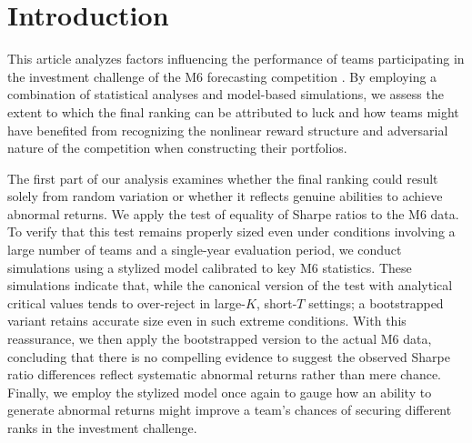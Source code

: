\documentclass[3p,times,twocolumn]{elsarticle}
\begin{document}
\section{Introduction}

This article analyzes factors influencing the performance of teams participating in the investment challenge of the M6 forecasting competition \citep[see][]{makridakisM6ForecastingCompetition2023}.
By employing a combination of statistical analyses and model-based simulations, we assess the extent to which the final ranking can be attributed to luck and how teams might have benefited from recognizing the nonlinear reward structure and adversarial nature of the competition when constructing their portfolios.

The first part of our analysis examines whether the final ranking could result solely from random variation or whether it reflects genuine abilities to achieve abnormal returns.
We apply the \cite{wrightTestEqualityMultiple2014} test of equality of Sharpe ratios to the M6 data.
To verify that this test remains properly sized even under conditions involving a large number of teams and a single-year evaluation period, we conduct simulations using a stylized model calibrated to key M6 statistics.
These simulations indicate that, while the canonical version of the test with analytical critical values tends to over-reject in large-$K$, short-$T$ settings; a bootstrapped variant retains accurate size even in such extreme conditions.
With this reassurance, we then apply the bootstrapped version to the actual M6 data, concluding that there is no compelling evidence to suggest the observed Sharpe ratio differences reflect systematic abnormal returns rather than mere chance.
Finally, we employ the stylized model once again to gauge how an ability to generate abnormal returns might improve a team’s chances of securing different ranks in the investment challenge.
\end{document}
